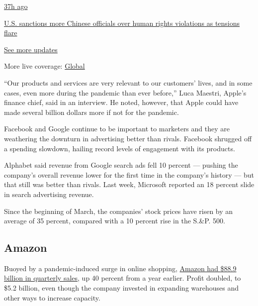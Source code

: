 \href{https://www.nytimes.com/live/2020/07/31/business/stock-market-today-coronavirus?action=click\&pgtype=Article\&state=default\&region=MAIN_CONTENT_1\&context=storylines_live_updates\#us-sanctions-more-chinese-officials-over-human-rights-violations-as-tensions-flare}{37h
ago}

\href{https://www.nytimes.com/live/2020/07/31/business/stock-market-today-coronavirus?action=click\&pgtype=Article\&state=default\&region=MAIN_CONTENT_1\&context=storylines_live_updates\#us-sanctions-more-chinese-officials-over-human-rights-violations-as-tensions-flare}{U.S.
sanctions more Chinese officials over human rights violations as
tensions flare}

\href{https://www.nytimes.com/live/2020/07/31/business/stock-market-today-coronavirus?action=click\&pgtype=Article\&state=default\&region=MAIN_CONTENT_1\&context=storylines_live_updates}{See
more updates}

More live coverage:
\href{https://www.nytimes.com/2020/08/01/world/coronavirus-covid-19.html?action=click\&pgtype=Article\&state=default\&region=MAIN_CONTENT_1\&context=storylines_live_updates}{Global}

``Our products and services are very relevant to our customers' lives,
and in some cases, even more during the pandemic than ever before,''
Luca Maestri, Apple's finance chief, said in an interview. He noted,
however, that Apple could have made several billion dollars more if not
for the pandemic.

Facebook and Google continue to be important to marketers and they are
weathering the downturn in advertising better than rivals. Facebook
shrugged off a spending slowdown, hailing record levels of engagement
with its products.

Alphabet said revenue from Google search ads fell 10 percent --- pushing
the company's overall revenue lower for the first time in the company's
history --- but that still was better than rivals. Last week, Microsoft
reported an 18 percent slide in search advertising revenue.

Since the beginning of March, the companies' stock prices have risen by
an average of 35 percent, compared with a 10 percent rise in the S.\&P.
500.

\hypertarget{amazon}{%
\subsection{Amazon}\label{amazon}}

Buoyed by a pandemic-induced surge in online shopping,
\href{https://www.nytimes.com/2020/05/22/technology/amazon-coronavirus-target-walmart.html}{Amazon
had \$88.9 billion in quarterly sales}, up 40 percent from a year
earlier. Profit doubled, to \$5.2 billion, even though the company
invested in expanding warehouses and other ways to increase capacity.

